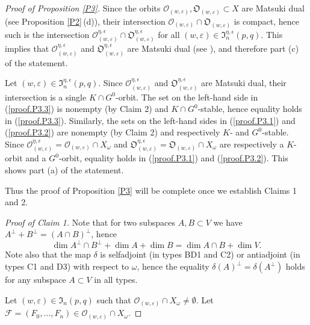\documentclass{amsart}
\theoremstyle{definition}
\begin{document}
\begin{proof}[Proof of Proposition \ref{P3}]
Since the orbits $\mathcal{O}_{(w,\varepsilon)},\mathfrak{O}_{(w,\varepsilon)}\subset X$ are Matsuki dual (see Proposition \ref{P2}\,{\rm (d)}), their intersection $\mathcal{O}_{(w,\varepsilon)}\cap\mathfrak{O}_{(w,\varepsilon)}$ is compact, hence such is the intersection $\mathcal{O}_{(w,\varepsilon)}^{\eta,\epsilon}\cap
\mathfrak{O}_{(w,\varepsilon)}^{\eta,\epsilon}$ for all $(w,\varepsilon)\in\mathfrak{I}_n^{\eta,\epsilon}(p,q)$.  This implies that $\mathcal{O}_{(w,\varepsilon)}^{\eta,\epsilon}$ and $\mathfrak{O}_{(w,\varepsilon)}^{\eta,\epsilon}$ are Matsuki dual (see \cite{Gindikin-Matsuki}), and therefore part {\rm (c)} of the statement.

Let $(w,\varepsilon)\in\mathfrak{I}_n^{\eta,\epsilon}(p,q)$. Since $\mathcal{O}_{(w,\varepsilon)}^{\eta,\epsilon}$ and $\mathfrak{O}_{(w,\varepsilon)}^{\eta,\epsilon}$ are Matsuki dual, their intersection is a single $K\cap G^0$-orbit. The set on the left-hand side in (\ref{proof.P3.3}) is nonempty (by Claim 2) and $K\cap G^0$-stable, hence equality holds in (\ref{proof.P3.3}). Similarly, the sets on the left-hand sides in (\ref{proof.P3.1}) and (\ref{proof.P3.2}) are nonempty (by Claim 2) and respectively $K$- and $G^0$-stable. Since $\mathcal{O}_{(w,\varepsilon)}^{\eta,\epsilon}=\mathcal{O}_{(w,\varepsilon)}\cap X_\omega$ and $\mathfrak{O}_{(w,\varepsilon)}^{\eta,\epsilon}=\mathfrak{O}_{(w,\varepsilon)}\cap X_\omega$ are respectively a $K$-orbit and a $G^0$-orbit, equality holds in (\ref{proof.P3.1}) and (\ref{proof.P3.2}). This shows part {\rm (a)} of the statement.

Thus the proof of Proposition \ref{P3} will be complete once we establish Claims 1 and 2.

\medskip
\noindent
{\it Proof of Claim 1.}
Note that for two subspaces $A,B\subset V$ we have
$A^\perp+B^\perp=(A\cap B)^\perp$, hence
\begin{equation}
\label{proof-P3.4}
\dim A^\perp\cap B^\perp+\dim A+\dim B=\dim A\cap B+\dim V.
\end{equation}
Note also that the map $\delta$ is selfadjoint (in types BD1 and C2) or antiadjoint (in types C1 and D3) with respect to $\omega$, hence the equality $\delta(A)^\perp=\delta(A^\perp)$ holds for any subspace $A\subset V$ in all types.

Let $(w,\varepsilon)\in\mathfrak{I}_n(p,q)$ such that $\mathcal{O}_{(w,\varepsilon)}\cap X_\omega\not=\emptyset$.
Let $\mathcal{F}=(F_0,\ldots,F_n)\in \mathcal{O}_{(w,\varepsilon)}\cap X_\omega$.


\end{proof}
\end{document}
